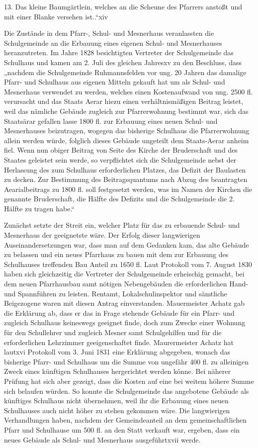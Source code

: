 \documentclass{book}
\begin{document}
13. Das kleine Baumgärtlein, welches an die Scheune des Pfarrers anstoßt und mit
einer Blanke versehen ist..“xiv



Die Zustände in dem Pfarr-, Schul- und Mesnerhaus veranlassten die Schulgemeinde
an die Erbauung eines eigenen Schul- und Mesnerhauses heranzutreten. Im Jahre
1828 besichtigten Vertreter der Schulgemeinde das Schulhaus und kamen am 2. Juli
des gleichen Jahresxv zu den Beschluss, dass „nachdem die Schulgemeinde
Ruhmannsfelden vor ung. 20 Jahren das damalige Pfarr- und Schulhaus aus eigenen
Mitteln gekauft hat um als Schul- und Mesnerhaus verwendet zu werden, welches
einen Kostenaufwand von ung. 2500 fl. verursacht und das Staats Aerar hiezu
einen verhältnismäßigen Beitrag leistet, weil das nämliche Gebäude zugleich zur
Pfarrerwohnung bestimmt war, sich das Staatsärar gefallen lasse 1800 fl. zur
Erbauung eines neuen Schul- und Mesnerhauses beizutragen, wogegen das bisherige
Schulhaus die Pfarrerwohnung allein werden würde, folglich dieses Gebäude
ungeteilt dem Staats-Aerar anheim fiel. Wenn nun obiger Beitrag von Seite des
Kirche der Bruderschaft und des Staates geleistet sein werde, so verpflichtet
sich die Schulgemeinde nebst der Herlassung des zum Schulhaus erforderlichen
Platzes, das Defizit der Baulasten zu decken. Zur Bestimmung des
Beitragsquantums nach Abzug des beantragten Aearialbeitrags zu 1800 fl. soll
festgesetzt werden, was im Namen der Kirchen die genannte Bruderschaft, die
Hälfte des Defizits und die Schulgemeinde die 2. Hälfte zu tragen habe.“

Zunächst setzte der Streit ein, welcher Platz für das zu erbauende Schul- und
Mesnerhaus der geeignetste wäre. Der Erfolg dieser langwierigen
Auseinandersetzungen war, dass man auf dem Gedanken kam, das alte Gebäude zu
belassen und ein neues Pfarrhaus zu bauen mit dem zur Erbauung des Schulhauses
treffenden Bau Anteil zu 1650 fl. Laut Protokoll vom 7. August 1830 haben sich
gleichzeitig die Vertreter der Schulgemeinde erheischig gemacht, bei dem neuen
Pfarrhausbau samt nötigen Nebengebäuden die erforderlichen Hand- und Spannführen
zu leisten. Rentamt, Lokalschulinspektor und sämtliche Beigezogene waren mit
diesen Antrag einverstanden. Mauermeister Achatz gab die Erklärung ab, dass er
das in Frage stehende Gebäude für ein Pfarr- und zugleich Schulhaus keineswegs
geeignet finde, doch zum Zwecke einer Wohnung für den Schullehrer und zugleich
Mesner samt Schulgehilfen und für die erforderlichen Lehrzimmer geeigenschaftet
finde. Maurermeister Achatz hat lautxvi Protokoll vom 3. Juni 1831 eine
Erklärung abgegeben, wonach das bisherige Pfarr- und Schulhaus um die Summe von
ungefähr 400 fl. zu alleinigen Zweck eines künftigen Schulhauses hergerichtet
werden könne. Bei näherer Prüfung hat sich aber gezeigt, dass die Kosten auf
eine bei weitem höhere Summe sich belaufen würden. So konnte die Schulgemeinde
das angebotene Gebäude als künftiges Schulhaus nicht übernehmen, weil ihr die
Erbauung eines neuen Schulhauses auch nicht höher zu stehen gekommen wäre. Die
langwierigen Verhandlungen haben, nachdem der Gemeindeanteil an dem
gemeinschaftlichen Pfarr und Schulhause um 500 fl. an den Statt verkauft war,
ergeben, dass ein neues Gebäude als Schul- und Mesnerhaus ausgeführtxvii werde.
\end{document}
